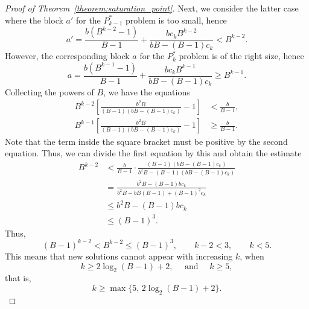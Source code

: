 \documentclass[sn-mathphys]{sn-jnl}%
\theoremstyle{thmstyleone}%
\newtheorem{theorem}{Theorem}%
\theoremstyle{thmstyletwo}%
\theoremstyle{thmstylethree}%
\begin{document}
\begin{appendices}
\begin{proof}[Proof of Theorem~\ref{theorem:saturation_point}]
    Next, we consider the latter case where the block $a'$ for the $P^*_{k - 1}$ problem is
    too small, hence \[
        a' = \frac{b(B^{k - 2} - 1)}{B - 1} + \frac{bc_kB^{k - 2}}{bB - (B - 1)c_k} < 
        B^{k - 2}.
    \] However, the corresponding block $a$ for the $P^*_k$ problem is of the right size,
    hence \[
        a = \frac{b(B^{k - 1} - 1)}{B - 1} + \frac{bc_kB^{k - 1}}{bB - (B - 1)c_k} \geq
        B^{k - 1}.
    \] Collecting the powers of $B$, we have the equations \begin{align*}
        B^{k - 2}\left[\frac{b^2B}{(B - 1)(bB - (B - 1)c_k)} - 1\right] 
        &< \frac{b}{B - 1}, \\
        B^{k - 1}\left[\frac{b^2B}{(B - 1)(bB - (B - 1)c_k)} - 1\right] 
        &\geq \frac{b}{B - 1}.
    \end{align*} Note that the term inside the square bracket must be positive by the
    second equation. Thus, we can divide the first equation by this and obtain the 
    estimate \begin{align*}
        B^{k - 2} &< \frac{b}{B - 1}\cdot 
        \frac{(B - 1)(bB - (B - 1)c_k)}{b^2B - (B - 1)(bB - (B - 1)c_k)} \\
        &= \frac{b^2B - (B - 1)bc_k}{b^2B - bB(B -1) + (B - 1)^2c_k} \\
        &\leq b^2B - (B - 1)bc_k \\
        &\leq (B - 1)^3.
    \end{align*}
    Thus, \[
        (B - 1)^{k - 2} < B^{k - 2} \leq (B - 1)^3, \qquad
        k - 2 < 3, \qquad
        k < 5.
    \] This means that new solutions cannot appear with increasing $k$,
    when \[
        k \geq 2\log_2(B - 1) + 2,\quad \text{ and }\quad k \geq 5,
    \] that is, \[
        k \geq \max\{5,\, 2\log_2(B - 1) + 2\}. %
    \]
\end{proof}





\end{appendices}
\end{document}
